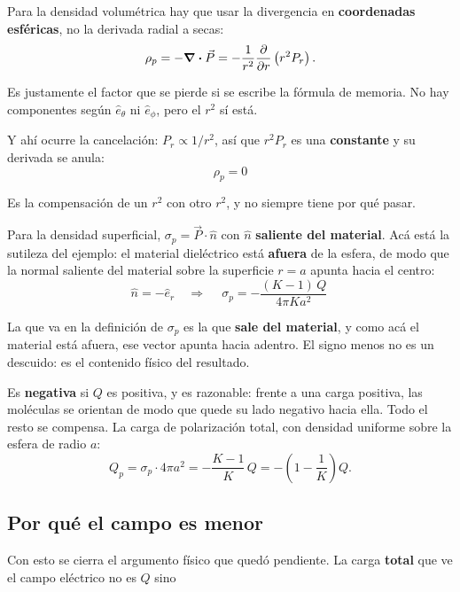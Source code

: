 \documentclass[12pt,a4paper]{article}
\begin{document}
Para la densidad volumétrica hay que usar la divergencia en \textbf{coordenadas
esféricas}, no la derivada radial a secas:
\[
\rho_p = -\div \vec P
= -\frac{1}{r^2}\pdv{r}\left(r^2 P_r\right).
\]

\begin{warnbox}
Es justamente el factor que se pierde si se escribe la fórmula de memoria. No hay
componentes según $\hat e_\theta$ ni $\hat e_\phi$, pero el $r^2$ sí está.
\end{warnbox}

Y ahí ocurre la cancelación: $P_r \propto 1/r^2$, así que $r^2 P_r$ es una
\textbf{constante} y su derivada se anula:
\[
\boxed{\ \rho_p = 0\ }
\]

\begin{notebox}
Es la compensación de un $r^2$ con otro $r^2$, y no siempre tiene por qué pasar.
\end{notebox}

Para la densidad superficial, $\sigma_p = \vec P \cdot \hat n$ con $\hat n$
\textbf{saliente del material}. Acá está la sutileza del ejemplo: el material
dieléctrico está \textbf{afuera} de la esfera, de modo que la normal saliente del
material sobre la superficie $r=a$ apunta hacia el centro:
\[
\hat n = -\hat e_r
\quad\Longrightarrow\quad
\boxed{\ \sigma_p = -\frac{(K-1)\,Q}{4\pi K a^2}\ }
\]

\begin{warnbox}
La que va en la definición de $\sigma_p$ es la que \textbf{sale del material}, y
como acá el material está afuera, ese vector apunta hacia adentro. El signo menos
no es un descuido: es el contenido físico del resultado.
\end{warnbox}

Es \textbf{negativa} si $Q$ es positiva, y es razonable: frente a una carga
positiva, las moléculas se orientan de modo que quede su lado negativo hacia
ella. Todo el resto se compensa. La carga de polarización total, con densidad
uniforme sobre la esfera de radio $a$:
\[
Q_p = \sigma_p \cdot 4\pi a^2 = -\frac{K-1}{K}\,Q
= -\left(1 - \frac{1}{K}\right) Q .
\]

\subsection{Por qué el campo es menor}

Con esto se cierra el argumento físico que quedó pendiente. La carga
\textbf{total} que ve el campo eléctrico no es $Q$ sino
\end{document}
